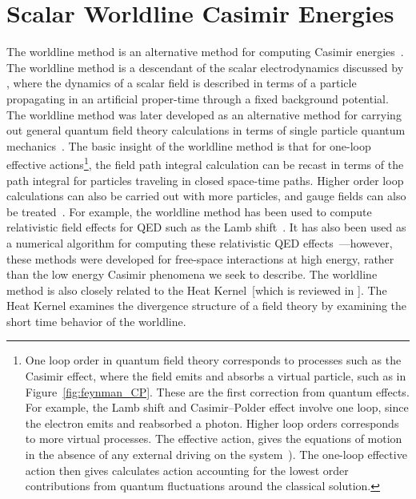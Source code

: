 \section{Scalar Worldline Casimir Energies}
\label{sec:dirichlet_worldline}
The worldline method is an alternative method for computing Casimir energies~\citep{Gies2003}.
The worldline method is a descendant of the scalar electrodynamics 
discussed by \citet{Feynman1950}, where the dynamics of a scalar field 
is described in terms of a particle propagating in an artificial proper-time through a fixed background potential. 
The worldline method was later developed as an alternative method for 
carrying out general quantum field theory calculations in terms of single particle 
quantum mechanics~\citep{McKeon1993, Strassler1992,Schubert2001}.  
The basic insight of the worldline method is that for one-loop effective actions\footnote{
One loop order in quantum field theory corresponds to processes such as the Casimir effect,
where the field emits and absorbs a virtual particle, such as in Figure~\ref{fig:feynman_CP}.  
These are the first correction from quantum effects.  For example, the Lamb shift and Casimir--Polder 
effect involve one loop, since the electron emits and reabsorbed a photon.  Higher loop orders 
corresponds to more virtual processes.  
The effective action, gives the equations of motion in the absence of any external driving on the system~\citep[Ch. 16]{WeinbergQFT2}).  
The one-loop effective action then gives calculates action accounting for the lowest order contributions from quantum fluctuations
around the classical solution.}, 
the field path integral calculation can be recast in terms of the path
 integral for particles traveling in closed space-time paths.
  Higher order loop calculations can also be carried out with more particles, 
and gauge fields can also be treated~\citep{Schubert2001}.
For example, the worldline method has been used to compute relativistic
field effects for QED such as the Lamb shift~\citep{Schmidt1995}.  
It has also been used as a numerical algorithm for computing these relativistic 
QED effects~\citep{Mazur2014}---however, these methods were developed for free-space interactions at high energy, rather than the 
low energy Casimir phenomena we seek to describe.  
The worldline method is also closely related to the Heat Kernel~[which is reviewed in \citet{Vassilevich2003}].
The Heat Kernel examines the divergence structure of a field theory by examining the short time behavior of the 
worldline.  


